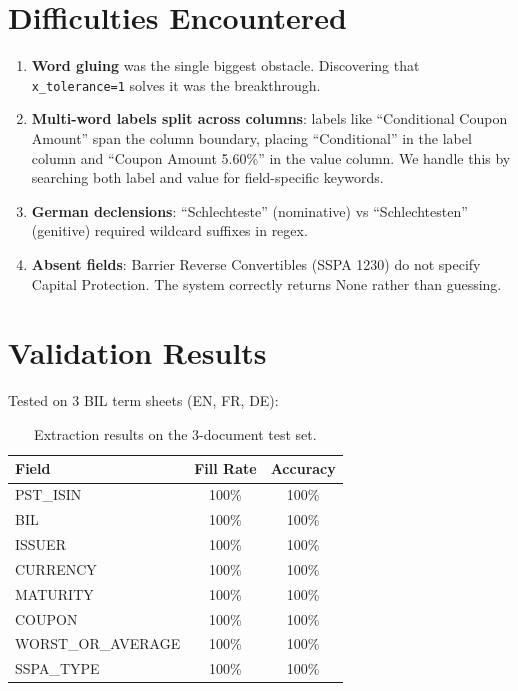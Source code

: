 \documentclass[11pt,a4paper]{article}
\begin{document}
\section{Difficulties Encountered}

\begin{enumerate}
  \item \textbf{Word gluing} was the single biggest obstacle. Discovering
        that \texttt{x\_tolerance=1} solves it was the breakthrough.
  \item \textbf{Multi-word labels split across columns}: labels like
        ``Conditional Coupon Amount'' span the column boundary, placing
        ``Conditional'' in the label column and ``Coupon Amount 5.60\%''
        in the value column. We handle this by searching both label and
        value for field-specific keywords.
  \item \textbf{German declensions}: ``Schlechteste'' (nominative) vs
        ``Schlechtesten'' (genitive) required wildcard suffixes in regex.
  \item \textbf{Absent fields}: Barrier Reverse Convertibles (SSPA 1230)
        do not specify Capital Protection. The system correctly returns
        None rather than guessing.
\end{enumerate}

\section{Validation Results}

Tested on 3 BIL term sheets (EN, FR, DE):

\begin{table}[h]
\centering
\begin{tabular}{lcc}
\toprule
\textbf{Field} & \textbf{Fill Rate} & \textbf{Accuracy} \\
\midrule
PST\_ISIN         & 100\% & 100\% \\
BIL               & 100\% & 100\% \\
ISSUER            & 100\% & 100\% \\
CURRENCY          & 100\% & 100\% \\
MATURITY          & 100\% & 100\% \\
COUPON            & 100\% & 100\% \\
WORST\_OR\_AVERAGE & 100\% & 100\% \\
SSPA\_TYPE        & 100\% & 100\% \\
\bottomrule
\end{tabular}
\caption{Extraction results on the 3-document test set.}
\end{table}
\end{document}
